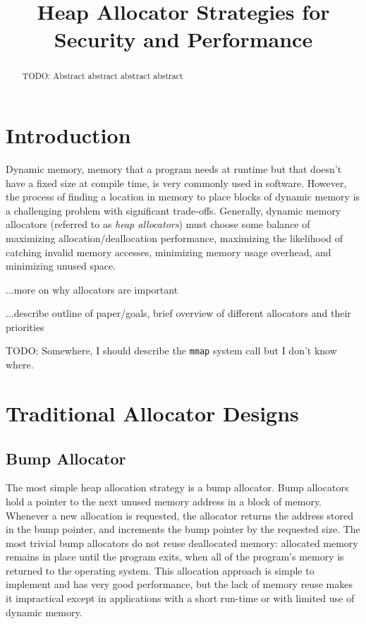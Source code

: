 \documentclass[conference]{IEEEtran}
\begin{document}
\title{Heap Allocator Strategies for Security and Performance}

\author{
}

\maketitle

\begin{abstract}
	\color{red} TODO: Abstract abstract abstract abstract
\end{abstract}

\section{Introduction}
Dynamic memory, memory that a program needs at runtime but that doesn't have a fixed size at compile time, is very commonly used in software.
However, the process of finding a location in memory to place blocks of dynamic memory is a challenging problem with significant trade-offs.
Generally, dynamic memory allocators (referred to as \emph{heap allocators}) must choose some balance of maximizing allocation/deallocation performance, maximizing the likelihood of catching invalid memory accesses, minimizing memory usage overhead, and minimizing unused space.

	{\color{red}...more on why allocators are important}

	{\color{red}...describe outline of paper/goals, brief overview of different allocators and their priorities}

	{\color{red} TODO: Somewhere, I should describe the \verb|mmap| system call but I don't know where.}

\section{Traditional Allocator Designs}

\subsection{Bump Allocator}

The most simple heap allocation strategy is a bump allocator.
Bump allocators hold a pointer to the next unused memory address in a block of memory.
Whenever a new allocation is requested, the allocator returns the address stored in the bump pointer, and increments the bump pointer by the requested size.
The most trivial bump allocators do not reuse deallocated memory: allocated memory remains in place until the program exits, when all of the program's memory is returned to the operating system.
This allocation approach is simple to implement and has very good performance, but the lack of memory reuse makes it impractical except in applications with a short run-time or with limited use of dynamic memory.
\end{document}
